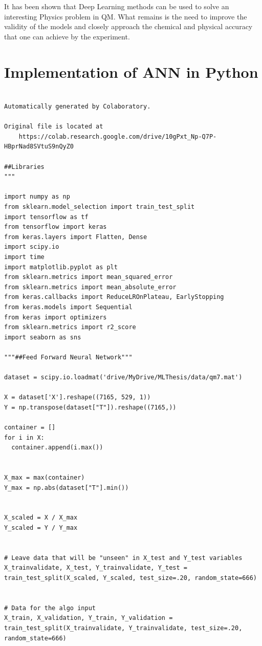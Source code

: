 \documentclass[a4paper,oneside,openright,11pt]{book}
\begin{document}
It has been shown that Deep Learning methods can be used to solve an interesting Physics problem in QM. What remains is the need to improve the validity of the models and closely approach the chemical and physical accuracy that one can achieve by the experiment.



\appendix
\appendixpage
\addappheadtotoc
\chapter{Implementation of ANN in Python}



\begin{lstlisting}

Automatically generated by Colaboratory.

Original file is located at
    https://colab.research.google.com/drive/10gPxt_Np-Q7P-HBprNad8SVtuS9nQyZ0

##Libraries
"""

import numpy as np
from sklearn.model_selection import train_test_split
import tensorflow as tf
from tensorflow import keras
from keras.layers import Flatten, Dense
import scipy.io
import time
import matplotlib.pyplot as plt
from sklearn.metrics import mean_squared_error
from sklearn.metrics import mean_absolute_error
from keras.callbacks import ReduceLROnPlateau, EarlyStopping
from keras.models import Sequential
from keras import optimizers
from sklearn.metrics import r2_score
import seaborn as sns

"""##Feed Forward Neural Network"""

dataset = scipy.io.loadmat('drive/MyDrive/MLThesis/data/qm7.mat')

X = dataset['X'].reshape((7165, 529, 1)) 
Y = np.transpose(dataset["T"]).reshape((7165,))

container = []
for i in X:
  container.append(i.max())
  

X_max = max(container)
Y_max = np.abs(dataset["T"].min())


X_scaled = X / X_max
Y_scaled = Y / Y_max


# Leave data that will be "unseen" in X_test and Y_test variables
X_trainvalidate, X_test, Y_trainvalidate, Y_test = train_test_split(X_scaled, Y_scaled, test_size=.20, random_state=666)


# Data for the algo input
X_train, X_validation, Y_train, Y_validation = train_test_split(X_trainvalidate, Y_trainvalidate, test_size=.20, random_state=666)




\end{lstlisting}
\end{document}

